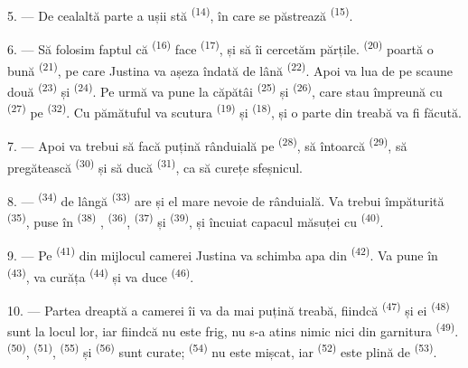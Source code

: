 5. --- De cealaltă parte a ușii stă 
\textsuperscript{(14)}, în care se păstrează 
\textsuperscript{(15)}.

6. --- Să folosim faptul că  \textsuperscript{(16)} face
 \textsuperscript{(17)}, și să îi cercetăm părțile. 
\textsuperscript{(20)} poartă o  bună \textsuperscript{(21)}, pe
care Justina va așeza îndată  de lână \textsuperscript{(22)}.
Apoi va lua de pe scaune două  \textsuperscript{(23)} și
 \textsuperscript{(24)}. Pe urmă va pune la căpătâi
 \textsuperscript{(25)} și  \textsuperscript{(26)},
care stau împreună cu  \textsuperscript{(27)} pe
 \textsuperscript{(32)}. Cu pămătuful va scutura
 \textsuperscript{(19)} și 
\textsuperscript{(18)}, și o parte din treabă va fi făcută.

7. --- Apoi va trebui să facă puțină rânduială pe 
\textsuperscript{(28)}, să întoarcă 
\textsuperscript{(29)}, să pregătească 
\textsuperscript{(30)} și să ducă  \textsuperscript{(31)}, ca să
curețe sfeșnicul.

\VUsaut{5.0mm}
\VUsaut{3.0mm}

8. ---  \textsuperscript{(34)} de lângă 
\textsuperscript{(33)} are și el mare nevoie de rânduială. Va trebui împăturită
 \textsuperscript{(35)}, puse în 
\textsuperscript{(38)} , 
\textsuperscript{(36)},  \textsuperscript{(37)} și
 \textsuperscript{(39)}, și încuiat capacul măsuței cu
 \textsuperscript{(40)}.

9. --- Pe  \textsuperscript{(41)} din mijlocul camerei
Justina va schimba apa din  \textsuperscript{(42)}. Va pune
 în  \textsuperscript{(43)}, va curăța
 \textsuperscript{(44)} și va duce  \textsuperscript{(46)}.

10. --- Partea dreaptă a camerei îi va da mai puțină treabă, fiindcă
 \textsuperscript{(47)} și  ei
\textsuperscript{(48)} sunt la locul lor, iar fiindcă nu este frig, nu s-a atins
nimic nici din garnitura  \textsuperscript{(49)}.
 \textsuperscript{(50)}, 
\textsuperscript{(51)},  \textsuperscript{(55)} și
 \textsuperscript{(56)} sunt curate;
 \textsuperscript{(54)} nu este mișcat, iar
 \textsuperscript{(52)} este plină de 
\textsuperscript{(53)}.

